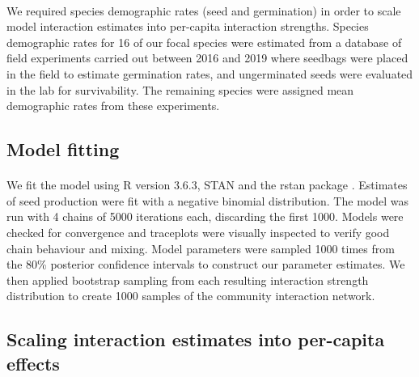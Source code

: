 \documentclass[a4,12pt]{article}
\begin{document}
        \paragraph{} 
        We required species demographic rates (seed and germination) in order to scale model interaction estimates into per-capita interaction strengths. Species demographic rates for 16 of our focal species were estimated from a database of field experiments carried out between 2016 and 2019 where seedbags were placed in the field to estimate germination rates, and ungerminated seeds were evaluated in the lab for survivability. The remaining species were assigned mean demographic rates from these experiments. 

        \subsection{Model fitting}

        \paragraph{}
        We fit the model using R version 3.6.3, STAN and the rstan package \parencite{R2020, Carpenter2017, Rstan2020}. Estimates of seed production were fit with a negative binomial distribution. The model was run with 4 chains of 5000 iterations each, discarding the first 1000. Models were checked for convergence and traceplots were visually inspected to verify good chain behaviour and mixing. Model parameters were sampled 1000 times from the 80\% posterior confidence intervals to construct our parameter estimates. We then applied bootstrap sampling from each resulting interaction strength distribution to create 1000 samples of the community interaction network.

        \subsection{Scaling interaction estimates into per-capita effects}
\end{document}
